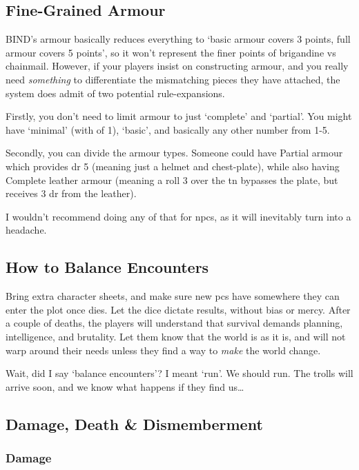 \begin{multicols}{2}
\subsection{Fine-Grained Armour}

BIND's armour basically reduces everything to `basic armour covers 3 points, full armour covers 5 points', so it won't represent the finer points of brigandine vs chainmail.
However, if your players insist on constructing armour, and you really need \emph{something} to differentiate the mismatching pieces they have attached, the system does admit of two potential rule-expansions.

Firstly, you don't need to limit armour to just `complete' and `partial'.
You might have `minimal' (with  of 1), `basic', and basically any other number from 1-5.

Secondly, you can divide the armour types.
Someone could have Partial armour which provides \gls{dr} 5 (meaning just a helmet and chest-plate), while also having Complete leather armour (meaning a roll 3 over the \gls{tn} bypasses the plate, but receives 3 \gls{dr} from the leather).

I wouldn't recommend doing any of that for \glspl{npc}, as it will inevitably turn into a headache.

\subsection{How to Balance Encounters}

Bring extra character sheets, and make sure new \glspl{pc} have somewhere they can enter the plot once  dies.
Let the dice dictate results, without bias or mercy.
After a couple of deaths, the players will understand that survival demands planning, intelligence, and brutality.
Let them know that the world is as it is, and will not warp around their needs unless they find a way to \emph{make} the world change.

Wait, did I say `balance encounters'?
I meant `run'.
We should run.
The trolls will arrive soon, and we know what happens if they find us\ldots

\subsection{Damage, Death \& Dismemberment}

\subsubsection{Damage}


\end{multicols}

